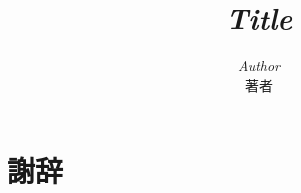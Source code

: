 \documentclass[10pt,a4j,openany,dvipdfmx]{jsbook}
\title{{\it Title}}
\author{{\it Author }\\著者}
\date{\todaye}
\begin{document}
\maketitle
\frontmatter
\tableofcontents 

\newpage



\mainmatter




\chapter*{謝辞}



\end{document}
